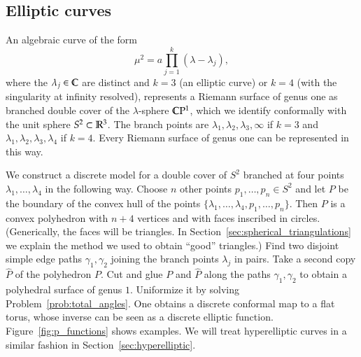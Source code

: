 \documentclass[Thesis]{subfiles}
\begin{document}

\subsection{Elliptic curves}
\label{sec:elliptic_curves}

An algebraic curve of the form
\begin{equation}
  \label{eq:elliptic_curve}
  \mu^{2}=a\prod_{j=1}^{k}(\lambda-\lambda_{j}),
\end{equation}
where the $\lambda_{j}\in\mathbb C$ are distinct and $k=3$ (an elliptic
curve) or $k=4$ (with the singularity at infinity resolved),
represents a Riemann surface of genus one as branched double cover of
the $\lambda$-sphere $\mathbb C\mathrm{P}^{1}$, which we identify conformally
with the unit sphere $S^{2}\subset\mathbb R^{3}$. The branch points are
$\lambda_{1},\lambda_{2},\lambda_{3},\infty$ if $k=3$ and
$\lambda_{1},\lambda_{2},\lambda_{3},\lambda_{4}$ if $k=4$. Every
Riemann surface of genus one can be represented in this way.


We construct a discrete model for a double cover of $S^{2}$ branched
at four points $\lambda_1,\ldots,\lambda_{4}$ in the following way.
Choose $n$ other points $p_1,\ldots,p_n\in S^2$ and let $P$ be the
boundary of the convex hull of the points
$\{\lambda_1,\ldots,\lambda_{4},p_1,\ldots,p_n\}$. Then $P$ is a
convex polyhedron with $n+4$ vertices and with faces inscribed in
circles. (Generically, the faces will be triangles. In
Section~\ref{sec:spherical_triangulations} we explain the method we
used to obtain ``good'' triangles.) Find two disjoint simple edge
paths $\gamma_1,\gamma_{2}$ joining the branch points $\lambda_{j}$ in
pairs. Take a second copy $\hat P$ of the polyhedron $P$. Cut and glue
$P$ and $\hat P$ along the paths $\gamma_1,\gamma_{2}$ to obtain a
polyhedral surface of genus $1$. Uniformize it by solving
Problem~\ref{prob:total_angles}. One obtains a discrete conformal map
to a flat torus, whose inverse can be seen as a discrete elliptic
function. Figure~\ref{fig:p_functions} shows examples. We will treat
hyperelliptic curves in a similar fashion in
Section~\ref{sec:hyperelliptic}.
\end{document}
